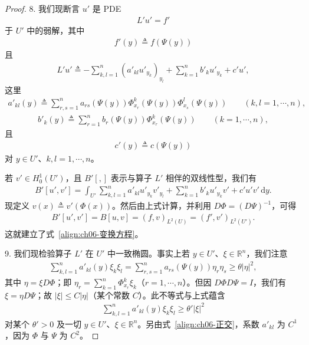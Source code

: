 \documentclass[../../main.tex]{subfiles}
\begin{document}
\begin{proof}
8. 我们现断言 $u'$ 是 PDE
\begin{align}
L'u'=f'
\end{align}
于 $U'$ 中的弱解，其中
\begin{align}
f'(y)\triangleq f(\Psi(y))
\end{align}
且
\begin{align}
L'u'\triangleq-\sum_{k,l=1}^{n}(a'_{kl}u'_{y_{k}})_{y_{l}}+\sum_{k=1}^{n}b'_{k}u'_{y_{k}}+c'u',
\end{align}
这里
\begin{align}
a'_{kl}(y)\triangleq\sum_{r,s=1}^{n}a_{rs}(\Psi(y))\Phi^{k}_{x_{r}}(\Psi(y))\Phi^{l}_{x_{s}}(\Psi(y))\qquad (k,l=1,\cdots,n),
\end{align}
\begin{align}
b'_{k}(y)\triangleq\sum_{r=1}^{n}b_{r}(\Psi(y))\Phi^{k}_{x_{r}}(\Psi(y))\qquad (k=1,\cdots,n),
\end{align}
且
\begin{align}
c'(y)\triangleq c(\Psi(y))
\end{align}
对 $y\in U'$、$k,l=1,\cdots,n$。

若 $v'\in H^{1}_{0}(U')$，且 $B'[,]$ 表示与算子 $L'$ 相伴的双线性型，我们有
\begin{align}
B'[u',v']=\int_{U'}\sum_{k,l=1}^{n}a'_{kl}u'_{y_{k}}v'_{y_{l}}+\sum_{k=1}^{n}b'_{k}u'_{y_{k}}v'+c'u'v'\,\mathrm{d}y.
\end{align}
现定义 $v(x)\triangleq v'(\Phi(x))$。然后由上式计算，并利用 $D\Phi=(D\Psi)^{-1}$，可得
\begin{align*}
B'[u',v']=B[u,v]=(f,v)_{L^{2}(U)}=(f',v')_{L^{2}(U')}.
\end{align*}
这就建立了式~\eqref{align:ch06-变换方程}。

9. 我们现检验算子 $L'$ 在 $U'$ 中一致椭圆。事实上若 $y\in U'$、$\xi\in\mathbb{R}^{n}$，我们注意
\begin{align}
\sum_{k,l=1}^{n}a'_{kl}(y)\xi_{k}\xi_{l}
=\sum_{r,s=1}^{n}a_{rs}(\Psi(y))\eta_{r}\eta_{s}\geqslant\theta|\eta|^{2},
\end{align}
其中 $\eta=\xi D\Phi$；即 $\eta_{r}=\sum_{k=1}^{n}\Phi^{k}_{x_{r}}\xi_{k}$（$r=1,\cdots,n$）。但因 $D\Phi D\Psi=I$，我们有 $\xi=\eta D\Psi$；故 $|\xi|\leqslant C|\eta|$（某个常数 $C$）。此不等式与上式蕴含
\begin{align}
\sum_{k,l=1}^{n}a'_{kl}(y)\xi_{k}\xi_{l}\geqslant\theta'|\xi|^{2}
\end{align}
对某个 $\theta'>0$ 及一切 $y\in U'$、$\xi\in\mathbb{R}^{n}$。另由式~\eqref{align:ch06-正交}，系数 $a'_{kl}$ 为 $C^{1}$，因为 $\Phi$ 与 $\Psi$ 为 $C^{2}$。


\end{proof}
\end{document}
